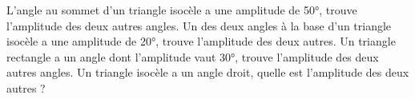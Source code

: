 %
%
    \begin{tasks}
        \task L'angle au sommet d'un triangle isocèle a
        une amplitude de \ang{50}, trouve l'amplitude des deux
        autres angles.
        \task Un des deux angles à la base d'un triangle isocèle a
        une amplitude de \ang{20}, trouve l'amplitude des deux
        autres.
        \task Un triangle rectangle a un angle dont l'amplitude
        vaut \ang{30}, trouve l'amplitude des deux autres angles.
        \task Un triangle isocèle a un angle droit, quelle est
        l'amplitude des deux autres ?
    \end{tasks}
